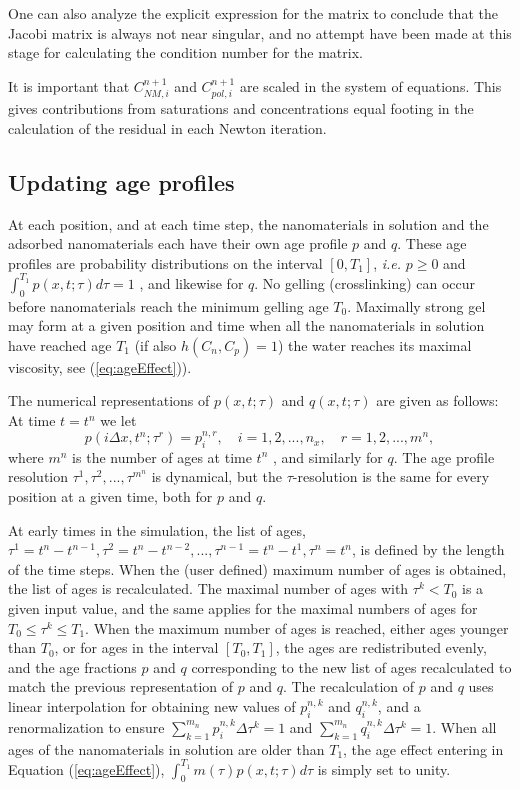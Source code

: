 \documentclass[nanomaterials,article,submit,moreauthors,pdftex]{Definitions/mdpi}
\begin{document}
One can also analyze the explicit expression for the matrix to conclude that the Jacobi matrix is always not near singular, and no attempt have been made at this stage for calculating the condition number for the matrix.

It is important that  $C^{n+1}_{\textit{NM}, i}$ and $C^{n+1}_{pol, i}$ are scaled in the system of equations. This gives contributions from saturations and concentrations equal footing in the calculation of the residual in each Newton iteration.

\subsection{Updating age profiles}
At each position, and at each time step, the nanomaterials in solution and the adsorbed nanomaterials each have their own age profile $p$ and $q$. These age profiles are probability distributions on the interval $[0,T_1]$, \textit{i.e.} $p\geq0$  and $\int^{T_1}_0 p(x,t;\tau)d\tau=1$  , and likewise for  $q$. No gelling (crosslinking) can occur before nanomaterials reach the minimum gelling age  $T_0$. Maximally strong gel may form at a given position and time when all the nanomaterials in solution have reached age $T_1$ (if also $h(C_n,C_p)=1$) the water reaches its maximal viscosity, see (\ref{eq:ageEffect})).

The numerical representations of $p(x,t;\tau)$ and $q(x,t;\tau)$ are given as follows: At time $t=t^n$ we let
\begin{equation}
    p(i\Delta x,t^n;\tau^r)=p^{n,r}_i, \quad i=1,2,...,n_x, \quad r=1,2,...,m^n,
\end{equation}
where $m^n$ is the number of ages at time $t^n$ , and similarly for $q$. The age profile resolution $\tau^1,\tau^2,...,\tau^{m^n}$ is dynamical, but the  $\tau$-resolution is the same for every position at a given time, both for $p$ and $q$.

At early times in the simulation, the list of ages, $\tau^1=t^n-t^{n-1},\tau^2=t^n-t^{n-2},...,\tau^{n-1}=t^n-t^1, \tau^{n}=t^n$, is defined by the length of the time steps. When the (user defined) maximum number of ages is obtained, the list of ages is recalculated. The maximal number of ages with $\tau^k<T_0$  is a given input value, and the same applies for the maximal numbers of ages for  $T_0\leq\tau^k\leq T_1$. When the maximum number of ages is reached, either ages younger than  $T_0$, or for ages in the interval $[T_0,T_1]$, the ages are redistributed evenly, and the age fractions $p$ and $q$ corresponding to the new list of ages recalculated to match the previous representation of $p$ and $q$. The recalculation of $p$ and $q$ uses linear interpolation for obtaining new values of  $p^{n,k}_i$ and $q^{n,k}_i$, and a renormalization to ensure $\sum^{m_n}_{k=1} p_i^{n,k}\Delta\tau^k=1$  and  $\sum^{m_n}_{k=1} q_i^{n,k}\Delta\tau^k=1$. When all ages of the nanomaterials in solution are older than $T_1$, the age effect entering in Equation (\ref{eq:ageEffect}), $\int^{T_1}_{0} m(\tau)p(x,t;\tau)d\tau$ is simply set to unity.
\end{document}
